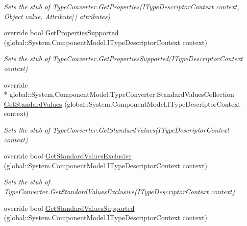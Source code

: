 \begin{DoxyCompactItemize}
\begin{DoxyCompactList}\small\item\em Sets the stub of Type\-Converter.\-Get\-Properties(\-I\-Type\-Descriptor\-Context context, Object value, Attribute\mbox{[}$\,$\mbox{]} attributes)\end{DoxyCompactList}\item 
override bool \hyperlink{class_system_1_1_security_1_1_authentication_1_1_extended_protection_1_1_fakes_1_1_stub_extendedf67afed15bbc0df07bfc91316f6f81f0_a7f7ba66efc6beccb24bd663ac5796ab1}{Get\-Properties\-Supported} (global\-::\-System.\-Component\-Model.\-I\-Type\-Descriptor\-Context context)
\begin{DoxyCompactList}\small\item\em Sets the stub of Type\-Converter.\-Get\-Properties\-Supported(\-I\-Type\-Descriptor\-Context context)\end{DoxyCompactList}\item 
override \\*
global\-::\-System.\-Component\-Model.\-Type\-Converter.\-Standard\-Values\-Collection \hyperlink{class_system_1_1_security_1_1_authentication_1_1_extended_protection_1_1_fakes_1_1_stub_extendedf67afed15bbc0df07bfc91316f6f81f0_acb41b776bc64b8ed1a76e127625c0d79}{Get\-Standard\-Values} (global\-::\-System.\-Component\-Model.\-I\-Type\-Descriptor\-Context context)
\begin{DoxyCompactList}\small\item\em Sets the stub of Type\-Converter.\-Get\-Standard\-Values(\-I\-Type\-Descriptor\-Context context)\end{DoxyCompactList}\item 
override bool \hyperlink{class_system_1_1_security_1_1_authentication_1_1_extended_protection_1_1_fakes_1_1_stub_extendedf67afed15bbc0df07bfc91316f6f81f0_ac0d41456242312dd021db1956ef2d883}{Get\-Standard\-Values\-Exclusive} (global\-::\-System.\-Component\-Model.\-I\-Type\-Descriptor\-Context context)
\begin{DoxyCompactList}\small\item\em Sets the stub of Type\-Converter.\-Get\-Standard\-Values\-Exclusive(\-I\-Type\-Descriptor\-Context context)\end{DoxyCompactList}\item 
override bool \hyperlink{class_system_1_1_security_1_1_authentication_1_1_extended_protection_1_1_fakes_1_1_stub_extendedf67afed15bbc0df07bfc91316f6f81f0_a2a295a5c13f189a87c28317b794ec610}{Get\-Standard\-Values\-Supported} (global\-::\-System.\-Component\-Model.\-I\-Type\-Descriptor\-Context context)

\end{DoxyCompactItemize}
